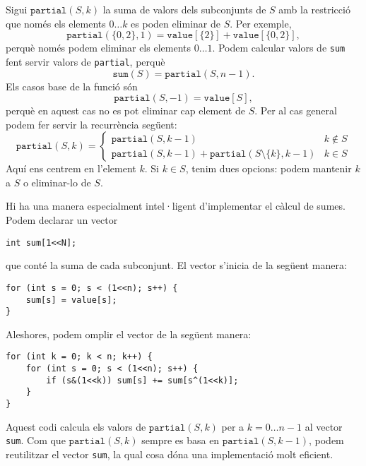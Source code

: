 Sigui $\texttt{partial}(S,k)$ la suma de valors dels subconjunts de
$S$ amb la restricció que només els elements $0 \ldots k$ es poden
eliminar de $S$. Per exemple,
\[\texttt{partial}(\{0,2\},1)=\texttt{value}[\{2\}]+\texttt{value}[\{0,2\}],\]
perquè només podem eliminar els elements $0 \ldots 1$. Podem calcular valors de \texttt{sum} fent servir valors de \texttt{partial}, perquè
\[\texttt{sum}(S) = \texttt{partial}(S,n-1).\]
Els casos base de la funció són
\[\texttt{partial}(S,-1)=\texttt{value}[S],\]
perquè en aquest cas no es pot eliminar cap element de $S$. Per al cas
general podem fer servir la recurrència següent:
\begin{equation*}
    \texttt{partial}(S,k) = \begin{cases}
               \texttt{partial}(S,k-1) & k \notin S \\
               \texttt{partial}(S,k-1) + \texttt{partial}(S \setminus \{k\},k-1) & k \in S
           \end{cases}
\end{equation*}
Aquí ens centrem en l'element $k$. Si $k \in S$, tenim dues opcions:
podem mantenir $k$ a $S$ o eliminar-lo de $S$.

Hi ha una manera especialment intel·ligent d'implementar el càlcul de
sumes. Podem declarar un vector
\begin{lstlisting}
int sum[1<<N];
\end{lstlisting}
que conté la suma de cada subconjunt. El vector s'inicia de la següent manera:
\begin{lstlisting}
for (int s = 0; s < (1<<n); s++) {
    sum[s] = value[s];
}
\end{lstlisting}
Aleshores, podem omplir el vector de la següent manera:
\begin{lstlisting}
for (int k = 0; k < n; k++) {
    for (int s = 0; s < (1<<n); s++) {
        if (s&(1<<k)) sum[s] += sum[s^(1<<k)];
    }
}
\end{lstlisting}
Aquest codi calcula els valors de $\texttt{partial}(S,k)$ per a
$k=0 \ldots n-1$ al vector \texttt{sum}. Com que
$\texttt{partial}(S,k)$ sempre es basa en $\texttt{partial}(S,k-1)$,
podem reutilitzar el vector \texttt{sum}, la qual cosa dóna una
implementació molt eficient.



